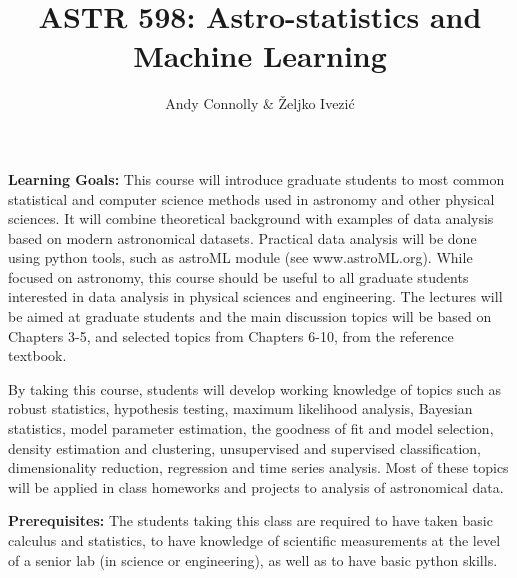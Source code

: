 \documentclass[10pt]{article}
\title{{\bf ASTR 598: Astro-statistics and Machine Learning}}
\author{Andy Connolly \& \v{Z}eljko Ivezi\'{c}}
\affil{University of Washington, Winter Quarter 2018}
\date{\vspace{-5ex}}
\begin{document}
\maketitle

\vskip 0.3in

\vskip 0.2in
\vskip 0.2in
\vskip 0.2in
\vskip 0.3in

{\bf Learning Goals:}
This course will introduce graduate students to most common statistical and computer science methods 
used in astronomy and other physical sciences. It will combine theoretical background with 
examples of data analysis based on modern astronomical datasets. Practical data analysis 
will be done using python tools, such as astroML module (see www.astroML.org). 
While focused on astronomy, this course should be useful to all graduate students interested in data 
analysis in physical sciences and engineering. The lectures will be aimed at graduate 
students and the main discussion topics will be based on Chapters 3-5, and selected 
topics from Chapters 6-10, from the reference textbook. 

By taking this course, students will develop working knowledge of topics such as robust 
statistics, hypothesis testing, maximum likelihood analysis, Bayesian statistics, model 
parameter estimation, the goodness of fit and model selection, density estimation and 
clustering, unsupervised and supervised classification, dimensionality reduction, 
regression and time series analysis. Most of these topics will be applied in class 
homeworks and projects to analysis of astronomical data. 

\vskip 0.2in
{\bf Prerequisites:}
The students taking this class are required to have taken basic calculus and statistics, 
to have knowledge of scientific measurements at the level of a senior lab (in science 
or engineering), as well as to have basic python skills. 
\end{document}
